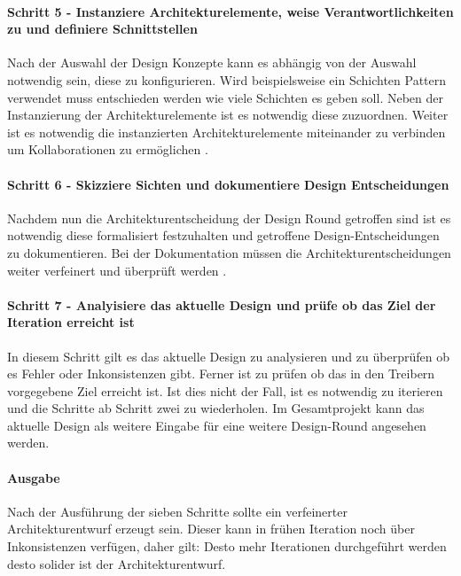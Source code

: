 \paragraph{Schritt 5 - Instanziere Architekturelemente, weise Verantwortlichkeiten zu und definiere Schnittstellen}
Nach der Auswahl der Design Konzepte kann es abhängig von der Auswahl notwendig sein, diese zu konfigurieren. Wird beispielsweise ein Schichten Pattern verwendet muss entschieden werden wie viele Schichten es geben soll. Neben der Instanzierung der Architekturelemente ist es notwendig diese zuzuordnen. Weiter ist es notwendig die instanzierten Architekturelemente miteinander zu verbinden um Kollaborationen zu ermöglichen \cite{add3}.\\

\paragraph{Schritt 6 - Skizziere Sichten und dokumentiere Design Entscheidungen}
Nachdem nun die Architekturentscheidung der Design Round getroffen sind ist es notwendig diese formalisiert festzuhalten und getroffene Design-Entscheidungen zu dokumentieren. Bei der Dokumentation müssen die Architekturentscheidungen weiter verfeinert und überprüft werden \cite{add3}. \\

\paragraph{Schritt 7 - Analyisiere das aktuelle Design und prüfe ob das Ziel der Iteration erreicht ist}
In diesem Schritt gilt es das aktuelle Design zu analysieren und zu überprüfen ob es Fehler oder Inkonsistenzen gibt. Ferner ist zu prüfen ob das in den Treibern vorgegebene Ziel erreicht ist. Ist dies nicht der Fall, ist es notwendig zu iterieren und die Schritte ab Schritt zwei zu wiederholen. Im Gesamtprojekt kann das aktuelle Design als weitere Eingabe für eine weitere Design-Round angesehen werden. 

\paragraph{Ausgabe}
Nach der Ausführung der sieben Schritte sollte ein verfeinerter Architekturentwurf erzeugt sein. Dieser kann in frühen Iteration noch über Inkonsistenzen verfügen, daher gilt: Desto mehr Iterationen durchgeführt werden desto solider ist der Architekturentwurf.